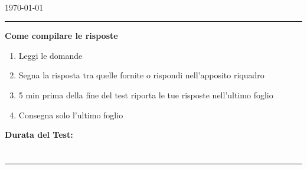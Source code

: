 \documentclass[12pt, onecolumn, addpoints]{exam}
\begin{document}
    \begin{centering}
        \LARGE {}\\
        \large \today\\[0.5em]
        \large {}\par
        \rule{\textwidth}{0.4pt}
    \end{centering}
    \nopointsinmargin
    \printanswers
    \renewcommand{\solutiontitle}{\noindent\textbf{Soluzione:}\enspace}
    \textbf{Come compilare le risposte}
    \begin{enumerate}
        \item Leggi le domande
        \item Segna la risposta tra quelle fornite o rispondi nell'apposito riquadro
        \item 5 min prima della fine del test riporta le tue risposte nell'ultimo foglio
        \item Consegna solo l'ultimo foglio
    \end{enumerate}
    \vspace{2cm}
    \textbf{Durata del Test:} 
    \newpage
    \section*{}
    \rule{\textwidth}{0.4pt}
    \begin{questions}
        \begin{choices}
                    \correctchoice {}
                    \choice {}
        \end{choices}
        \vspace{0.3cm}
    \end{questions}
\end{document}
